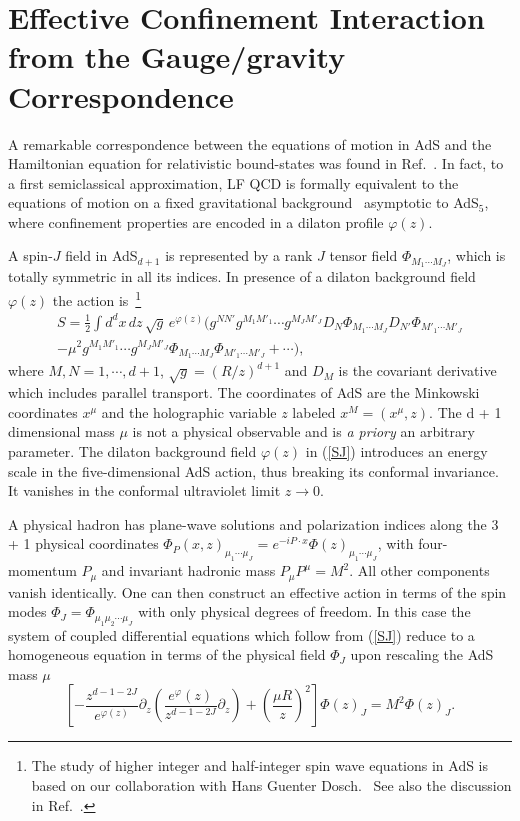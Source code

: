 \documentclass[prd,aps,onecolumn,nofootinbib]{revtex4}
\newcommand{\half}{{\frac{1}{2}}}
\begin{document}
\section{Effective Confinement Interaction from the Gauge/gravity Correspondence}

A remarkable correspondence between the equations of motion in AdS  and the Hamiltonian equation for relativistic bound-states  was found in Ref.~\cite{deTeramond:2008ht}.   In fact, to a first semiclassical approximation,
LF QCD  is formally equivalent to the equations of motion on a fixed gravitational background~\cite{deTeramond:2008ht} asymptotic to AdS$_5$, where  confinement properties  are encoded in a dilaton profile $\varphi(z)$. 


A spin-$J$ field in AdS$_{d+1}$ is represented by a rank $J$ tensor field $\Phi_{M_1 \cdots M_J}$, which is totally symmetric in all its indices.  In presence of a dilaton background field $\varphi(z)$ the action is~\footnote{The study of   higher integer and half-integer spin wave equations  in  AdS  is based on our collaboration with Hans Guenter Dosch.~\cite{DBT:2012}  See also the discussion in Ref.~\cite{Gutsche:2011vb}.}
\begin{multline} \label{SJ}
S = \half \int \! d^d x \, dz  \,\sqrt{g} \,e^{\varphi(z)}
  \Big( g^{N N'} g^{M_1 M'_1} \cdots g^{M_J M'_J} D_N \Phi_{M_1 \cdots M_J} D_{N'}  \Phi_{M'_1 \cdots M'_J}    \\
 - \mu^2  g^{M_1 M'_1} \cdots g^{M_J M'_J} \Phi_{M_1 \cdots M_J} \Phi_{M'_1 \cdots M'_J}  + \cdots \Big)  ,
\end{multline}
where $M, N = 1, \cdots , d+1$, $\sqrt{g} = (R/z)^{d+1}$ and $D_M$ is the covariant derivative which includes parallel transport. 
The coordinates of AdS are the Minkowski coordinates $x^\mu$ and the holographic variable $z$ labeled $x^M = \left(x^\mu, z\right)$. The  d + 1 dimensional mass $\mu$ is not a physical observable and is {\it a priory} an arbitrary
parameter. The dilaton background field $\varphi(z)$ in  (\ref{SJ})   introduces an energy scale in the five-dimensional AdS action, thus breaking its conformal invariance. It  vanishes in the conformal ultraviolet limit $z \to 0$.    
 

 A physical hadron has plane-wave solutions and polarization indices along the 3 + 1 physical coordinates
 $\Phi_P(x,z)_{\mu_1 \cdots \mu_J} = e^{- i P \cdot x} \Phi(z)_{\mu_1 \cdots \mu_J}$,
 with four-momentum $P_\mu$ and  invariant hadronic mass  $P_\mu P^\mu \! = M^2$. All other components vanish identically. 
 One can then construct an effective action in terms
 of the spin modes $\Phi_J = \Phi_{\mu_1 \mu_2 \cdots \mu_J}$ with only  physical degrees of 
 freedom. In this case the system of coupled differential equations which follow from (\ref{SJ}) reduce to a homogeneous equation in terms of the physical field $\Phi_J$
  upon rescaling the AdS mass $\mu$
 \begin{equation} \label{AdSWEJ}
\left[-\frac{ z^{d-1 -2 J}}{e^{\varphi(z)}}   \partial_z \left(\frac{e^\varphi(z)}{z^{d-1 - 2 J}} \partial_z\right)
+ \left(\frac{\mu R}{z}\right)^2\right] \Phi(z)_J = M^2 \Phi(z)_J .
 \end{equation}
\end{document}
